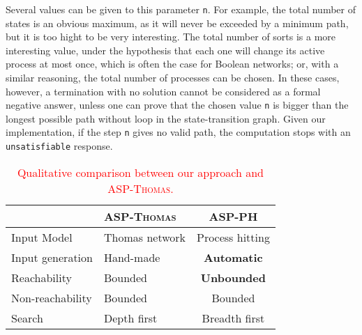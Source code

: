Several values can be given to this parameter \texttt{n}.
For example, the total number of states is an obvious maximum,
as it will never be exceeded by a minimum path,
but it is too hight to be very interesting.
The total number of sorts is a more interesting value,
under the hypothesis that each one will change its active process at most once,
which is often the case for Boolean networks;
or, with a similar reasoning, the total number of processes can be chosen.
In these cases, however, a termination with no solution cannot be considered as a formal
negative answer, unless one can prove that the chosen value \texttt{n}
is bigger than the longest possible path without loop in the state-transition graph.
Given our implementation, if the step \texttt{n} gives no valid path,
the computation stops with an \texttt{unsatisfiable} response.

\begin{table}[ht]
\begin{center}
\noindent%
\begin{tabular}{|l|l|c|}
\hline
  & \textsc{ASP-Thomas} & \textsc{ASP-PH} \\
\hline
\hline
 Input Model & Thomas network & Process hitting \\
\hline
 Input generation & Hand-made & {\bf Automatic} \\ %
\hline
 Reachability & Bounded & {\bf Unbounded} \\
\hline
 Non-reachability & Bounded & Bounded \\
\hline
 Search & Depth first & Breadth first \\
\hline
\end{tabular}
\vspace*{4pt}
\caption{\label{tab:qualitative_differences}
\textcolor{red}{Qualitative comparison between our approach and \textsc{ASP-Thomas}.}
}
\end{center}
\end{table}



